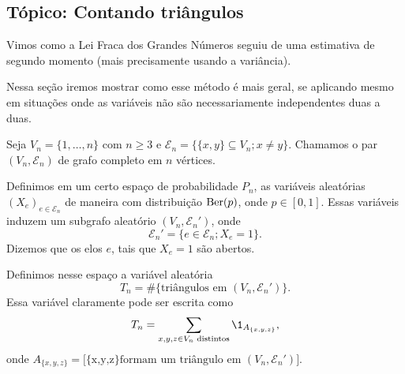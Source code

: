 \begin{topics}

\section{Tópico: Contando triângulos}

Vimos como a Lei Fraca dos Grandes Números seguiu de uma estimativa de segundo momento  (mais precisamente usando a variância).

Nessa seção iremos mostrar como esse método é mais geral, se aplicando mesmo em situações onde as variáveis não são necessariamente independentes duas a duas.

Seja $V_n = \{1, \dots, n\}$ com $n \geq 3$ e $\mathcal{E}_n = \big\{ \{x,y\} \subseteq V_n; x \neq y \big\}$.
Chamamos o par $(V_n, \mathcal{E}_n)$ de grafo completo em $n$ vértices.

Definimos em um certo espaço de probabilidade $P_n$, as variáveis aleatórias $(X_e)_{e \in \mathcal{E}_n}$ de maneira \iid com distribuição $\operatorname{Ber}(p)$, onde $p \in [0,1]$.
Essas variáveis induzem um subgrafo aleatório $(V_n, \mathcal{E}_n')$, onde
\begin{equation}
  \mathcal{E}_n' = \big\{ e \in \mathcal{E}_n; X_e = 1 \big\}.
\end{equation}
Dizemos que os elos $e$, tais que $X_e = 1$ são abertos.

Definimos nesse espaço a variável aleatória
\begin{equation}
  T_n = \#\big\{\text{triângulos em $(V_n, \mathcal{E}_n')$}\big\}.
\end{equation}
Essa variável claramente pode ser escrita como
\begin{equation}
  T_n = \sum_{x,y,z \in V_n \text{ distintos}} \1_{A_{\{x,y,z\}}},
\end{equation}
onde $A_{\{x,y,z\}} = \big[\text{\{x,y,z\} formam um triângulo em $(V_n, \mathcal{E}_n')$}\big]$.


\end{topics}
